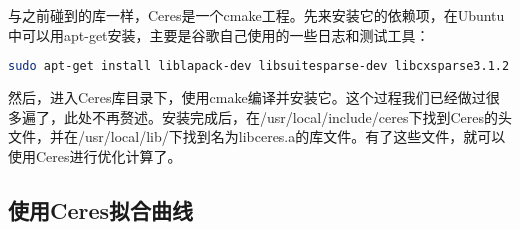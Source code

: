 与之前碰到的库一样，Ceres是一个cmake工程。先来安装它的依赖项，在Ubuntu中可以用apt-get安装，主要是谷歌自己使用的一些日志和测试工具：

\begin{lstlisting}[language=sh]
sudo apt-get install liblapack-dev libsuitesparse-dev libcxsparse3.1.2 libgflags-dev libgoogle-glog-dev libgtest-dev 
\end{lstlisting}

然后，进入Ceres库目录下，使用cmake编译并安装它。这个过程我们已经做过很多遍了，此处不再赘述。安装完成后，在/usr/local/include/ceres下找到Ceres的头文件，并在/usr/local/lib/下找到名为libceres.a的库文件。有了这些文件，就可以使用Ceres进行优化计算了。

\subsection{使用Ceres拟合曲线}

